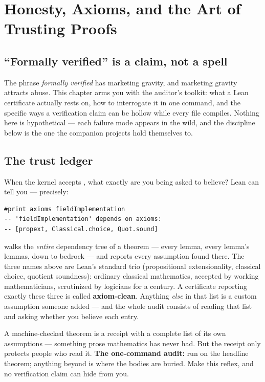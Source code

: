 \chapter{Honesty, Axioms, and the Art of Trusting Proofs}
\label{ch:honesty}

\section{``Formally verified'' is a claim, not a spell}

The phrase \emph{formally verified} has marketing gravity, and marketing
gravity attracts abuse. This chapter arms you with the auditor's toolkit:
what a Lean certificate actually rests on, how to interrogate it in one
command, and the specific ways a verification claim can be hollow while
every file compiles. Nothing here is hypothetical --- each failure mode
appears in the wild, and the discipline below is the one the companion
projects hold themselves to.

\section{The trust ledger}

When the kernel accepts , what exactly are you
being asked to believe? Lean can tell you --- precisely:

\begin{lstlisting}[language=Lean]
#print axioms fieldImplementation
-- 'fieldImplementation' depends on axioms:
-- [propext, Classical.choice, Quot.sound]
\end{lstlisting}

 walks the \emph{entire} dependency tree of a theorem
--- every lemma, every lemma's lemmas, down to bedrock --- and reports every
assumption found there. The three names above are Lean's standard trio
(propositional extensionality, classical choice, quotient soundness):
ordinary classical mathematics, accepted by working mathematicians,
scrutinized by logicians for a century. A certificate reporting exactly
these three is called \textbf{axiom-clean}. Anything \emph{else} in that
list is a custom assumption someone added --- and the whole audit consists
of reading that list and asking whether you believe each entry.

\begin{bigidea}
A machine-checked theorem is a receipt with a complete list of its own
assumptions --- something prose mathematics has never had. But the receipt
only protects people who read it. \textbf{The one-command audit:} run
 on the headline theorem; anything beyond
 is where the bodies are
buried. Make this reflex, and no verification claim can hide from you.
\end{bigidea}

